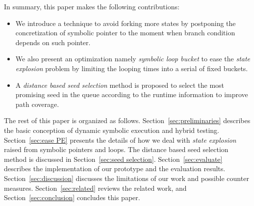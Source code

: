In summary, this paper makes the following contributions:
\begin{itemize}
\item We introduce a technique to avoid forking more states by postponing the concretization of symbolic pointer to the moment when branch condition depends on such pointer.  

\item We also present an optimization namely \emph{symbolic loop bucket} to ease the \textit{state explosion} problem by limiting the looping times into a serial of fixed buckets.

\item A \emph{distance based seed selection} method is proposed to select the most promising seed in the queue according to the runtime information to improve path coverage. 
\end{itemize}


The rest of this paper is organized as follows. 
 Section~\ref{sec:preliminaries} describes the basic conception of dynamic symbolic execution and hybrid testing. 
 Section~\ref{sec:ease PE} presents the details of how we deal with \textit{state explosion} raised from symbolic pointers and loops. The distance based seed selection method is discussed in Section~\ref{sec:seed selection}. Section~\ref{sec:evaluate} describes the implementation of our prototype and the evaluation results. Section~\ref{sec:discussion} discusses the limitations of our work and possible counter measures. Section~\ref{sec:related} reviews the related work, and Section~\ref{sec:conclusion} concludes this paper.
